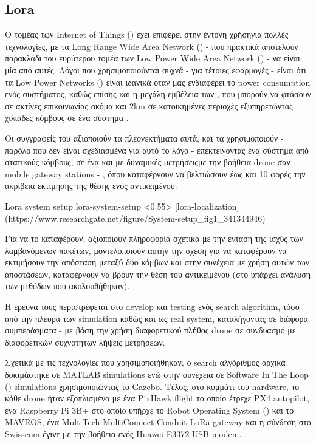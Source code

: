 \subsection{Lora}

Ο τομέας των Internet of Things () έχει επιφέρει στην έντονη χρήση\udot για πολλές τεχνολογίες, με τα Long Range Wide Area Network () - που πρακτικά αποτελούν παρακλάδι του ευρύτερου τομέα των Low Power Wide Area Network () - να είναι μία από αυτές. Λόγοι που χρησιμοποιούνται συχνά - για τέτοιες εφαρμογές - είναι ότι τα Low Power Networks () είναι ιδανικά όταν μας ε\-νδια\-φέ\-ρει το 
power consumption ενός συστήματος, καθώς επίσης και η μεγάλη εμβέλεια των , που μπορούν να φτάσουν σε ακτίνες επικοινωνίας ακόμα και 2km σε κατοικημένες περιοχές εξυπηρετώντας χιλιάδες κόμβους σε ένα σύστημα \cite{lora-localization}.

Οι συγγραφείς του \cite{lora-localization} αξιοποιούν τα πλεονεκτήματα αυτά,
και τα χρησιμοποιούν - παρόλο που δεν είναι σχεδιασμένα για αυτό το λόγο - επεκτείνοντας ένα σύστημα από στατικούς κόμβους, σε ένα και με δυναμικές μετρήσεις\udot με την βοήθεια drone σαν  mobile gateway stations - , όπου καταφέρνουν να βελτιώσουν έως και 10 φορές την ακρίβεια εκτίμησης της θέσης ενός αντικειμένου.

%
{Lora system setup}%
{lora-system-setup}%
<0.55>%
[lora-localization](https://www.researchgate.net/figure/System-setup_fig1_341344946)

Για να το καταφέρουν, αξιοποιούν πληροφορία σχετικά με την ένταση της ισχύς των λαμβανόμενων πακέτων, μοντελοποιούν αυτήν την σχέση για να καταφέρουν να εκτιμήσουν την απόσταση μεταξύ δύο κόμβων και στην συνέχεια με χρήση αυτών των αποστάσεων, καταφέρνουν να 
βρουν την θέση του αντικειμένου (στο  υπάρχει ανάλυση των μεθόδων που ακολουθήθηκαν).

Η έρευνα τους περιστρέφεται στο develop και testing ενός search algorithm, τόσο από την πλευρά των simulation καθώς και ως real system, καταλήγοντας σε διάφορα συμπεράσματα - με βάση την χρήση διαφορετικού πλήθος drone σε συνδυασμό με διαφορετικών συχνοτήτων λήψεις μετρήσεων.

Σχετικά με τις τεχνολογίες που χρησιμοποιήθηκαν, ο search αλγόριθμος αρχικά δοκιμάστηκε σε 
MATLAB simulations ενώ στην συνέχεια σε Software In The Loop () simulations χρησιμοποιώντας 
το Gazebo. Τέλος, στο κομμάτι του hardware, το κάθε drone ήταν εξοπλισμένο με ένα PixHawk flight το οποίο έτρεχε PX4 autopilot, ένα Raspberry Pi 3B+ στο οποίο υπήρχε το Robot Operating System () και το MAVROS, ένα MultiTech MultiConnect Conduit LoRa gateway και η σύνδεση στο Swisscom  έγινε με την βοήθεια ενός Huawei E3372 USB modem.

